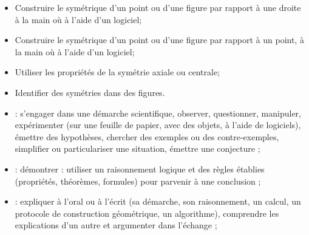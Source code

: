 \begin{myobj}
	\begin{itemize}
		
		\item Construire le symétrique d’un point ou d'une figure par rapport à une droite à la main où à l’aide d’un logiciel;
		\item Construire le symétrique d’un point ou d'une figure par rapport à un point, à la main où à l’aide d’un logiciel;
		\item Utiliser les propriétés de la symétrie axiale ou centrale;
		\item Identifier des symétries dans des figures.		
	\end{itemize}
\end{myobj}

\begin{mycomp}
	\begin{itemize}
		\item {} :  s’engager    dans    une    démarche    scientifique, observer, questionner, manipuler, expérimenter (sur une feuille de papier, avec des objets, à l’aide de logiciels), émettre des hypothèses, chercher des exemples ou des contre-exemples, simplifier ou particulariser une situation, émettre une conjecture ;
		\item {} :  démontrer : utiliser un raisonnement logique et des règles établies (propriétés, théorèmes, formules) pour parvenir à une conclusion ;
		\item {} :  expliquer à l’oral ou à l’écrit (sa démarche, son raisonnement, un calcul, un protocole   de   construction   géométrique, un algorithme), comprendre les explications d’un autre et argumenter dans l’échange ; 
		
	\end{itemize}
\end{mycomp}


